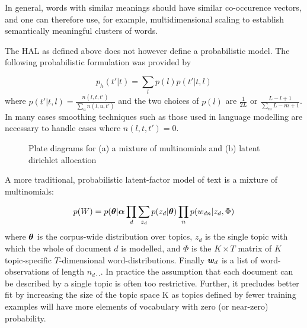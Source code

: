 In general, words with similar meanings should have similar co-occurence vectors, and one can therefore use, for example, multidimensional scaling to establish semantically meaningful clusters of words\cite{Lund1996}.

The HAL as defined above does not however define a probabilistic model. The following probabilistic formulation was provided by \cite{Azzopardi2005}

\begin{equation*}
p_h(t'|t) = \sum_l p(l) p(t'|t,l)
\end{equation*}
where $p(t'|t,l) = \frac{n(l, t, t')}{\sum_u n(l, u, t')}$ and the two choices of $p(l)$ are $\frac{1}{2L}$ or $\frac{L - l + 1}{\sum_m L - m + 1}$. In many cases smoothing techniques such as those used in language modelling are necessary to handle cases where $n(l,t,t') = 0$.
%
%


\begin{figure}
\centering
    \subfigure[]{
        
    }
    \subfigure[]{
        
    }
    \caption{Plate diagrams for (a) a mixture of multinomials and (b) latent dirichlet allocation}
\label{fig:plates}
\end{figure}

A more traditional, probabilistic latent-factor model of text is a mixture of multinomials\cite{Nigam2000}:

\begin{align}
p(W) = p(\bm \theta|\bm \alpha \prod_d \sum_{z_d} p(z_d|\bm \theta)\prod_n p(w_{dn} | z_d, \Phi)
\end{align}
where $\bm \theta$ is the corpus-wide distribution over topics, $z_d$ is the single topic with which the whole of document $d$ is modelled, and $\Phi$ is the $K \times T$ matrix of $K$ topic-specific $T$-dimensional word-distributions. Finally $\bm w_d$ is a list of word-observations of length $n_{d\cdot\cdot}$. In practice the assumption that each document can be described by a single topic is often too restrictive. Further, it precludes better fit by increasing the size of the topic space K as topics defined by fewer training examples will have more elements of vocabulary with zero (or near-zero) probability.

